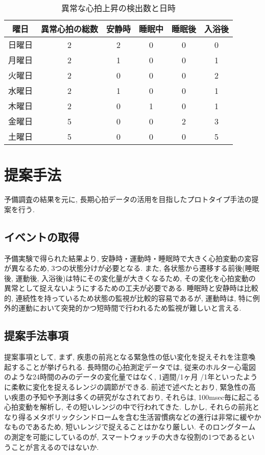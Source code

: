 \documentclass[report, 11pt, a4paper]{jsbook}
\begin{document}
\begin{table}[]
\centering
\caption{異常な心拍上昇の検出数と日時}
\begin{tabular}{cccccc}
\hline
曜日  & 異常心拍の総数 & 安静時 & 睡眠中 & 睡眠後 & 入浴後 \\ \hline
日曜日 & 2       & 2   & 0   & 0   & 0   \\
月曜日 & 2       & 1   & 0   & 0   & 1   \\
火曜日 & 2       & 0   & 0   & 0   & 2   \\
水曜日 & 2       & 1   & 0   & 0   & 1   \\
木曜日 & 2       & 0   & 1   & 0   & 1   \\
金曜日 & 5       & 0   & 0   & 2   & 3   \\
土曜日 & 5       & 0   & 0   & 0   & 5   \\ \hline
\end{tabular}
\end{table}


\chapter{提案手法}
予備調査の結果を元に, 長期心拍データの活用を目指したプロトタイプ手法の提案を行う. 

\section{イベントの取得}
予備実験で得られた結果より, 安静時・運動時・睡眠時で大きく心拍変動の変容が異なるため, 3つの状態分けが必要となる. また, 各状態から遷移する前後(睡眠後, 運動後, 入浴後)は特にその変化量が大きくなるため, その変化を心拍変動の異常として捉えないようにするための工夫が必要である. 睡眠時と安静時は比較的, 連続性を持っているため状態の監視が比較的容易であるが, 運動時は, 特に例外的運動において突発的かつ短時間で行われるため監視が難しいと言える. 

\section{提案手法事項}
提案事項として, まず, 疾患の前兆となる緊急性の低い変化を捉えそれを注意喚起することが挙げられる. 長時間の心拍測定データでは, 従来のホルター心電図のような24時間のみのデータの変化量ではなく, 1週間/1ヶ月 /1年といったように柔軟に変化を捉えるレンジの調節ができる. 前述で述べたとおり, 緊急性の高い疾患の予知や予測は多くの研究がなされており, それらは, 100msec毎に起こる心拍変動を解析し, その短いレンジの中で行われてきた. しかし, それらの前兆となり得るメタボリックシンドロームを含む生活習慣病などの進行は非常に緩やかなものであるため, 短いレンジで捉えることはかなり厳しい. そのロングタームの測定を可能にしているのが, スマートウォッチの大きな役割の1つであるということが言えるのではないか.\\  
\end{document}
